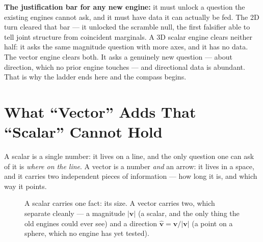 \documentclass[11pt, letterpaper, openany]{book}
\newcommand{\uvec}[1]{\hat{\mathbf{#1}}}
\begin{document}
\begin{signalbox}
\textbf{The justification bar for any new engine:} it must unlock a question the existing engines
cannot ask, and it must have data it can actually be fed. The 2D turn cleared that bar --- it unlocked
the scramble null, the first falsifier able to tell joint structure from coincident marginals. A 3D
scalar engine clears neither half: it asks the same magnitude question with more axes, and it has no
data. The vector engine clears both. It asks a genuinely new question --- about direction, which no
prior engine touches --- and directional data is abundant. That is why the ladder ends here and the
compass begins.
\end{signalbox}

\section{What ``Vector'' Adds That ``Scalar'' Cannot Hold}

A scalar is a single number: it lives on a line, and the only question one can ask of it is \emph{where
on the line}. A vector is a number \emph{and} an arrow: it lives in a space, and it carries two
independent pieces of information --- how long it is, and which way it points.

\begin{figure}[H]
\centering
{}
\caption{A scalar carries one fact: its size. A vector carries two, which separate cleanly ---
a magnitude $|\mathbf{v}|$ (a scalar, and the only thing the old engines could ever see) and a
direction $\uvec{v} = \mathbf{v}/|\mathbf{v}|$ (a point on a sphere, which no engine has yet
tested).}
\end{figure}
\end{document}
